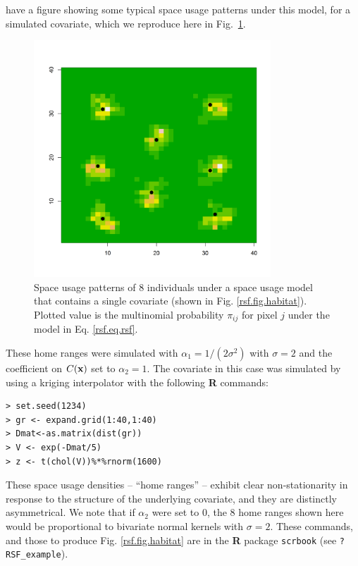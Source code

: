 \citet{royle_etal:2012mee} have a figure showing some typical space
usage patterns under this model, for a simulated covariate, which we
reproduce here in Fig.~\ref{rsf.fig.homeranges}. 
\begin{figure}[ht]
\centering
\includegraphics[width=3.5in,height=3.5in]{Ch13-RSF/figs/homeranges8}
\caption{Space usage patterns of 8 individuals under a space usage
  model that contains a single covariate (shown in
  Fig. \ref{rsf.fig.habitat}). Plotted value is the multinomial
  probability $\pi_{ij}$ for pixel $j$ under the model in Eq. \ref{rsf.eq.rsf}.
}
\label{rsf.fig.homeranges}
\end{figure}
These home ranges were simulated 
with $\alpha_{1} =
1/(2\sigma^2)$ with $\sigma = 2$ and the coefficient on $C({\bf x})$
set to $\alpha_{2} = 1$.
The covariate in this case was simulated by using a kriging
interpolator with the following {\bf R} commands:
\begin{verbatim}
> set.seed(1234)
> gr <- expand.grid(1:40,1:40)
> Dmat<-as.matrix(dist(gr))
> V <- exp(-Dmat/5)
> z <- t(chol(V))%*%rnorm(1600)
\end{verbatim}
These space usage densities -- ``home ranges'' -- exhibit clear
non-stationarity in response to the structure of the underlying
covariate, and they are distinctly asymmetrical.  We note that if
$\alpha_{2}$ were set to 0, the 8 home ranges shown here would
be proportional to bivariate normal kernels with $\sigma = 2$.
These commands, and those to produce Fig. \ref{rsf.fig.habitat} are in
the {\bf R} package \mbox{\tt scrbook} (see \mbox{\tt ?RSF_example}).

